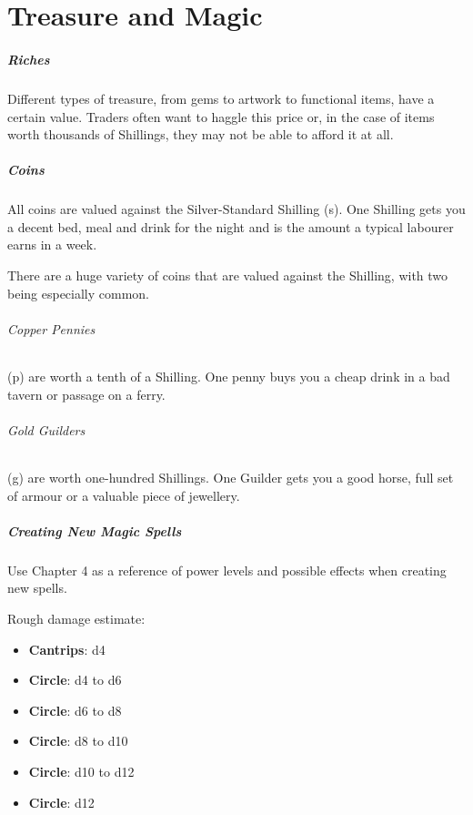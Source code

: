 \documentclass[itdr]{subfiles}
\begin{document}
\chapter{Treasure and Magic}

\paragraph{Riches}
Different types of treasure, from gems to artwork to functional items, have a certain value. Traders often want to haggle this price or, in the case of items worth thousands of Shillings, they may not be able to afford it at all.

\paragraph{Coins}
All coins are valued against the Silver-Standard Shilling (s). One Shilling gets you a decent bed, meal and drink for the night and is the amount a typical labourer earns in a week.

There are a huge variety of coins that are valued against the Shilling, with two being especially common.

\subparagraph{Copper Pennies} (p) are worth a tenth of a Shilling. One penny buys you a cheap drink in a bad tavern or passage on a ferry.

\subparagraph{Gold Guilders} (g) are worth one-hundred Shillings. One Guilder gets you a good horse, full set of armour or a valuable piece of jewellery.

\paragraph{Creating New Magic Spells}
Use Chapter 4 as a reference of power levels and possible effects when creating new spells.

Rough damage estimate:
\begin{itemize}
	\item \textbf{Cantrips}: d4
	\item \textbf{ Circle}: d4 to d6
	\item \textbf{ Circle}: d6 to d8
	\item \textbf{ Circle}: d8 to d10
	\item \textbf{ Circle}: d10 to d12
	\item \textbf{ Circle}: d12
\end{itemize}
\end{document}
